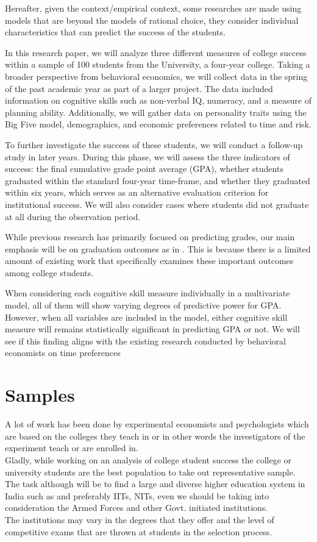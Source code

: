 \documentclass[12pt,a4paper]{article}
\begin{document}
{Hereafter, given the context/empirical context, some researches are made using models that are beyond the models of rational choice, they consider individual characteristics that can predict the success of the students.

In this research paper, we will analyze three different measures of college
success within a sample of 100 students from the University, a four-year college. Taking a broader perspective from behavioral economics, we will collect data in the spring of the past academic year as part of a larger project. The data included information on cognitive skills such as non-verbal IQ, numeracy, and a measure of planning ability. Additionally, we will gather data on personality traits using the Big Five model, demographics, and economic preferences related to time and risk.

To further investigate the success of these students, we will conduct a follow-up study in later years. During this phase, we will assess the three indicators of success: the final cumulative grade point average (GPA), whether students graduated within the standard four-year time-frame, and whether they graduated within six years, which serves as an alternative evaluation criterion for institutional success. We will also consider cases where students did not graduate at all during the observation period.

While previous research has primarily focused on predicting grades, our main emphasis will be on graduation outcomes as in \cite{Calinescu}. This is because there is a limited amount of existing work that specifically examines these important outcomes among college students.

When considering each cognitive skill measure individually in a multivariate model, all of them will show varying degrees of predictive power for GPA. However, when all variables are included in the model, either cognitive skill measure will remains statistically significant in predicting GPA or not. We will see if this finding aligns with the existing research conducted by behavioral economists on time preferences


\section{Samples}
A lot of work has been done by experimental economists and psychologists which are based on the colleges they teach in or in other words the investigators of the experiment teach or are enrolled in.\\
Gladly, while working on an analysis of college student success the college or university students are the best population to take out representative sample.\\
The task although will be to find a large and diverse higher education system in India such as and preferably IITs, NITs, even we should be taking into consideration the Armed Forces and other Govt. initiated institutions.\\
The institutions may vary in the degrees that they offer and the level of competitive exams that are thrown at students in the selection process.
}
\end{document}
